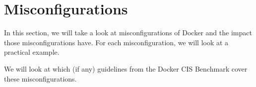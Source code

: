 \section{Misconfigurations}\label{section:misconfigurations}
In this section, we will take a look at misconfigurations of Docker and the impact those misconfigurations have. For each misconfiguration, we will look at a practical example.

\hfill

We will look at which (if any) guidelines from the Docker CIS Benchmark cover these misconfigurations.









